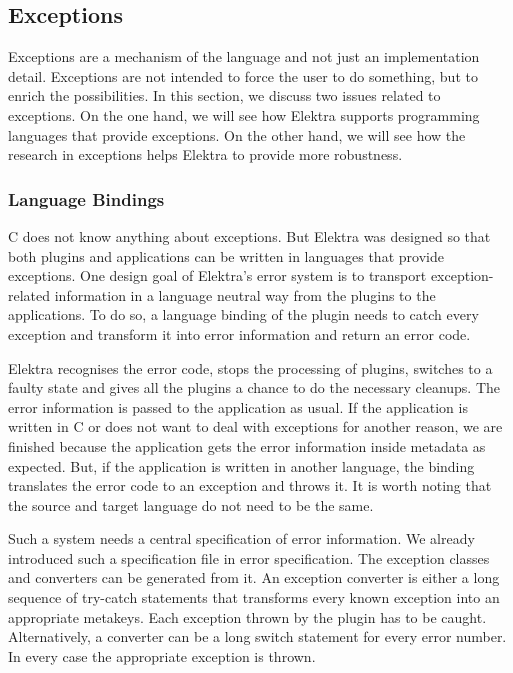 \subsection*{Exceptions}

Exceptions are a mechanism of the language and not just an implementation detail. Exceptions are not intended to force the user to do something, but to enrich the possibilities. In this section, we discuss two issues related to exceptions. On the one hand, we will see how Elektra supports programming languages that provide exceptions. On the other hand, we will see how the research in exceptions helps Elektra to provide more robustness.

\subsubsection*{Language Bindings}

C does not know anything about exceptions. But Elektra was designed so that both plugins and applications can be written in languages that provide exceptions. One design goal of Elektra's error system is to transport exception-\/related information in a language neutral way from the plugins to the applications. To do so, a language binding of the plugin needs to catch every exception and transform it into error information and return an error code.

Elektra recognises the error code, stops the processing of plugins, switches to a faulty state and gives all the plugins a chance to do the necessary cleanups. The error information is passed to the application as usual. If the application is written in C or does not want to deal with exceptions for another reason, we are finished because the application gets the error information inside metadata as expected. But, if the application is written in another language, the binding translates the error code to an exception and throws it. It is worth noting that the source and target language do not need to be the same.

Such a system needs a central specification of error information. We already introduced such a specification file in error specification. The exception classes and converters can be generated from it. An exception converter is either a long sequence of try-\/catch statements that transforms every known exception into an appropriate metakeys. Each exception thrown by the plugin has to be caught. Alternatively, a converter can be a long switch statement for every error number. In every case the appropriate exception is thrown.

